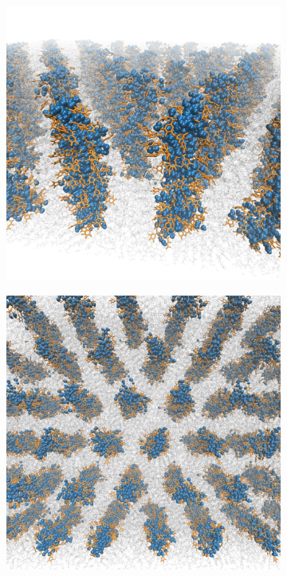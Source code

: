 \documentclass[journal=jpcbfk,manuscript=article]{achemso}
\begin{document}
  \begin{figure}
  \centering
  \begin{subfigure}{0.45\textwidth}
  \includegraphics[width=\textwidth]{ortho_view.pdf}
  \caption{}
  \end{subfigure}
  \begin{subfigure}{0.45\textwidth}
  \includegraphics[width=\textwidth]{top_view.pdf}

\end{subfigure}
\end{figure}
\end{document}
